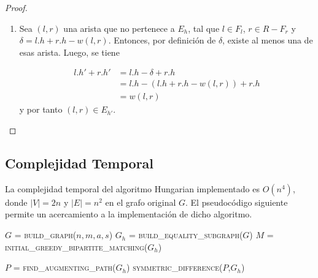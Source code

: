 \documentclass[10pt]{article} %
\begin{document}
\begin{proof}
\begin{enumerate}
			Se conoce que para $l \in F_l$ y $r \in F_r$ se cumple $l.h' + r.h' = l.h + r.h$. En caso contrario, cuando $l \in L-F_l$ y $r \in R-F_r$, se tiene que $l.h' = l.h$ y $r.h'=r.h$, entonces $l.h' + r.h' = l.h + r.h$. Por tanto, si la arista $(l,r)$ est\'a en el emparejamiento $M$ para el grafo $G_h$, entonces $(l,r) \in E_{h'}$.
			\item Sea $(l,r)$ una arista que no pertenece a $E_h$, tal que $l \in F_l$, $r \in R-F_r$ y $\delta = l.h + r.h - w(l,r)$. Entonces, por definici\'on de $\delta$, existe al menos una de esas arista. Luego, se tiene 
			
			\begin{align*}
				l.h' + r.h' &= l.h - \delta + r.h\\
				&= l.h - (l.h + r.h -w(l,r)) + r.h\\
				&= w(l,r)			
			\end{align*}
			y por tanto $(l,r) \in E_{h'}$. 
			
			
		\end{enumerate}
		
	\end{proof}
	
	
	\subsection{Complejidad Temporal}
	
	La complejidad temporal del algoritmo Hungarian implementado es $O(n^4)$, donde $|V|=2n$ y $|E|=n^2$ en el grafo original $G$. El pseudoc\'odigo siguiente permite un acercamiento a la implementaci\'on de dicho algoritmo.
	
	\vspace{1em}
	\begin{algorithmic}[1]
		\State $G$ = \textsc{build\_graph($n, m, a, s$)}
		\State $G_h$ = \textsc{build\_equality\_subgraph($G$})
		\State $M$ =\textsc{ initial\_greedy\_bipartite\_matching($G_h$)}
		
		\State $P$ = \textsc{find\_augmenting\_path($G_h$)}
		\State \textsc{symmetric\_difference($P$,$G_h$)}
		
		
		\EndWhile
		\EndFunction 
	\end{algorithmic}
	\vspace{1em}
	
\end{document}
